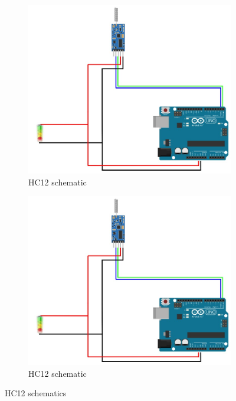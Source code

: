 \begin{figure}[H]
    \begin{subfigure}[b]{.49\linewidth}
        \centering
        \includegraphics[width=\linewidth]{img/AV/HC12.jpg}
        \caption{HC12 schematic}
    \end{subfigure}
    \begin{subfigure}[b]{.49\linewidth}
        \centering
        \includegraphics[width=\linewidth]{img/AV/HC12.jpg}
        \caption{HC12 schematic}
    \end{subfigure}
    \caption{HC12 schematics}
\end{figure}

